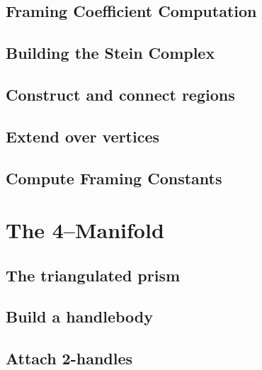 	\subsection{Framing Coefficient Computation}
	\label{sub:gleams}
	
	
	\subsection{Building the Stein Complex}
	\label{sub:steinbuild}
	

	\subsection{Construct and connect regions}
	
	
	\subsection{Extend over vertices}
	
	
	\subsection{Compute Framing Constants}
	

\section{The 4--Manifold}
\label{sec:4man}

	\subsection{The triangulated prism}
	
	
	\subsection{Build a handlebody}
	
	
	\subsection{Attach 2-handles}
	

